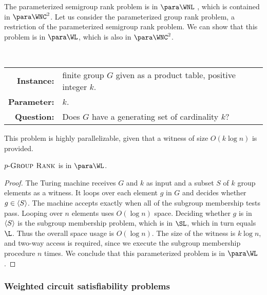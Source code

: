 The parameterized semigroup rank problem is in $\para \WNL$ \autocite[Theorem~3.12]{est15}, which is contained in $\para \WNC^2$.
Let us consider the parameterized group rank problem, a restriction of the parameterized semigroup rank problem.
We can show that this problem is in $\para \WL$, which is also in $\para \WNC^2$.

\begin{definition}[$\pgrouprank$]
  \mbox{} \\
  \begin{tabular}{r p{9.2cm}}
    \textbf{Instance:} & finite group $G$ given as a product table, positive integer $k$. \\
    \textbf{Parameter:} & $k$. \\
    \textbf{Question:} & Does $G$ have a generating set of cardinality $k$?
  \end{tabular}
\end{definition}

This problem is highly parallelizable, given that a witness of size $O(k \log n)$ is provided.

\begin{theorem}\label{thm:pgrouprank}
  $\pgrouprank$ is in $\para \WL$.
\end{theorem}
\begin{proof}
  The Turing machine receives $G$ and $k$ as input and a subset $S$ of $k$ group elements as a witness.
  It loops over each element $g$ in $G$ and decides whether $g \in \langle S\rangle$.
  The machine accepts exactly when all of the subgroup membership tests pass.
  Looping over $n$ elements uses $O(\log n)$ space.
  Deciding whether $g$ is in $\langle S\rangle$ is the subgroup membership problem, which is in $\SL$, which in turn equals $\L$.
  Thus the overall space usage is $O(\log n)$.
  The size of the witness is $k \log n$, and two-way access is required, since we execute the subgroup membership procedure $n$ times.
  We conclude that this parameterized problem is in $\para \WL$.
\end{proof}


\subsubsection{Weighted circuit satisfiability problems}

